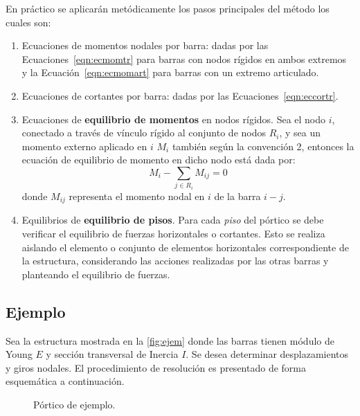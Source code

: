 En práctico se aplicarán metódicamente los pasos principales del método los cuales son:
%
\begin{enumerate}
	\item Ecuaciones de momentos nodales por barra: dadas por las Ecuaciones~\eqref{eqn:ecmomtr} para barras con nodos rígidos en ambos extremos y la Ecuación~\eqref{eqn:ecmomart} para barras con un extremo articulado. 
	
	\item Ecuaciones de cortantes por barra: dadas por las Ecuaciones~\eqref{eqn:eccortr}.
	\item Ecuaciones de \textbf{equilibrio de momentos} en nodos rígidos. Sea el nodo $i$, conectado a través de vínculo rígido al conjunto de nodos $R_i$, y sea un momento externo aplicado en $i$ $M_i$ también según la convención 2, entonces la ecuación de equilibrio de momento en dicho nodo está dada por:
	$$
	M_i -\sum_{j\in R_i} M_{ij} = 0
	$$
	donde $M_{ij}$ representa el momento nodal en $i$ de la barra $i-j$.
	
	\item Equilibrios de \textbf{equilibrio de pisos}. Para cada \textit{piso} del pórtico se debe verificar el equilibrio de fuerzas horizontales o cortantes. Esto se realiza aislando el elemento o conjunto de elementos horizontales correspondiente de la estructura, considerando las acciones realizadas por las otras barras y planteando el equilibrio de fuerzas.
	
\end{enumerate}


\subsection{Ejemplo}

Sea la estructura mostrada en la \autoref{fig:ejem} donde las barras tienen módulo de Young $E$ y sección transversal de Inercia $I$. %
%
Se desea determinar desplazamientos y giros nodales. %
El procedimiento de resolución es presentado de forma esquemática a continuación.
%
\begin{figure}[htb]
	\centering
\def\svgwidth{0.6\textwidth}

	\caption{Pórtico de ejemplo.}
	\label{fig:ejem}
\end{figure}


